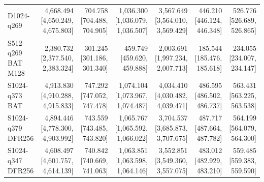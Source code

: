 \begin{table}[t]
{\begin{tabular}{lrrrrrr}
D1024-q269 & \shortstack{4,668.494\\{}[4,650.249, 4,675.803]} & \shortstack{704.758\\{}[704.488, 704.905]} & \shortstack{1,036.300\\{}[1,036.079, 1,036.507]} & \shortstack{3,567.649\\{}[3,564.010, 3,569.429]} & \shortstack{446.210\\{}[446.124, 446.348]} & \shortstack{526.776\\{}[526.689, 526.865]} \\
S512-q269 BAT M128 & \shortstack{2,380.732\\{}[2,377.540, 2,383.324]} & \shortstack{301.245\\{}[301.186, 301.340]} & \shortstack{459.749\\{}[459.620, 459.888]} & \shortstack{2,003.691\\{}[1,997.234, 2,007.713]} & \shortstack{185.544\\{}[185.476, 185.618]} & \shortstack{234.055\\{}[234.007, 234.147]} \\
S1024-q373 BAT & \shortstack{4,913.830\\{}[4,910.288, 4,915.833]} & \shortstack{747.292\\{}[747.052, 747.478]} & \shortstack{1,074.104\\{}[1,073.967, 1,074.487]} & \shortstack{4,034.410\\{}[4,030.482, 4,039.471]} & \shortstack{486.595\\{}[486.502, 486.737]} & \shortstack{563.431\\{}[563.225, 563.538]} \\
S1024-q379 DFR256 & \shortstack{4,894.446\\{}[4,778.300, 4,903.992]} & \shortstack{743.559\\{}[743.485, 743.820]} & \shortstack{1,065.767\\{}[1,065.592, 1,066.022]} & \shortstack{3,704.537\\{}[3,685.873, 3,707.675]} & \shortstack{487.717\\{}[487.664, 487.782]} & \shortstack{564.199\\{}[564.079, 564.300]} \\
S1024-q347 DFR256 & \shortstack{4,608.497\\{}[4,601.757, 4,614.139]} & \shortstack{740.842\\{}[740.669, 741.063]} & \shortstack{1,063.851\\{}[1,063.598, 1,064.146]} & \shortstack{3,552.851\\{}[3,549.360, 3,557.075]} & \shortstack{483.012\\{}[482.929, 483.210]} & \shortstack{559.485\\{}[559.383, 559.590]} \\

\end{tabular}}
\end{table}
